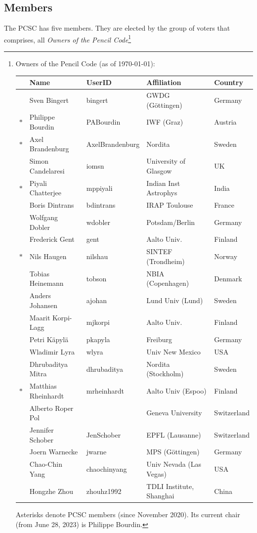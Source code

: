 \documentclass{article}
\begin{document}
\subsection{Members}

The PCSC has five members.
They are elected by the group of voters that comprises,
all {\em Owners of the Pencil Code}\footnote{
Owners of the {\sc Pencil Code} (as of \today):
\newpage
\begin{tabular}{cllll}
& Name & UserID & Affiliation & Country \\
\hline
& Sven Bingert       & bingert         & GWDG (G\"ottingen)   & Germany \\
$\ast$ & Philippe Bourdin   & PABourdin       & IWF (Graz)           & Austria \\
$\ast$ & Axel Brandenburg&AxelBrandenburg&Nordita             &Sweden\\
& Simon Candelaresi  & iomsn           & University of Glasgow & UK \\%
$\ast$ & Piyali Chatterjee & mppiyali  & Indian Inst Astrophys & India\\%
& Boris Dintrans     & bdintrans       & IRAP Toulouse        & France \\
& Wolfgang Dobler    & wdobler         & Potsdam/Berlin       & Germany \\ %
& Frederick Gent     & gent            & Aalto Univ.          & Finland \\%
$\ast$ & Nils Haugen & nilshau         & SINTEF (Trondheim)   & Norway \\
& Tobias Heinemann   & tobson          & NBIA (Copenhagen)    & Denmark \\
& Anders Johansen    & ajohan          & Lund Univ (Lund)     & Sweden \\
& Maarit Korpi-Lagg  & mjkorpi         & Aalto Univ.          & Finland \\ %
& Petri K\"apyl\"a   & pkapyla         & Freiburg             & Germany \\ %
& Wladimir Lyra      & wlyra           & Univ New Mexico      & USA \\
& Dhrubaditya Mitra  & dhrubaditya     & Nordita (Stockholm)  & Sweden \\ %
$\ast$ & Matthias Rheinhardt& mrheinhardt & Aalto Univ (Espoo)& Finland \\
& Alberto Roper Pol  &                 & Geneva University    & Switzerland \\
& Jennifer Schober   & JenSchober      & EPFL (Lausanne)      & Switzerland \\
& Joern Warnecke     & jwarne          & MPS (G\"ottingen)    & Germany \\ %
& Chao-Chin Yang     & chaochinyang    & Univ Nevada (Las Vegas) & USA \\ %
& Hongzhe Zhou       & zhouhz1992      & TDLI Institute, Shanghai & China \\ %
\end{tabular}
\newpage
Asterisks denote PCSC members (since November 2020).
Its current chair (from June 28, 2023) is Philippe Bourdin.
}
\end{document}

